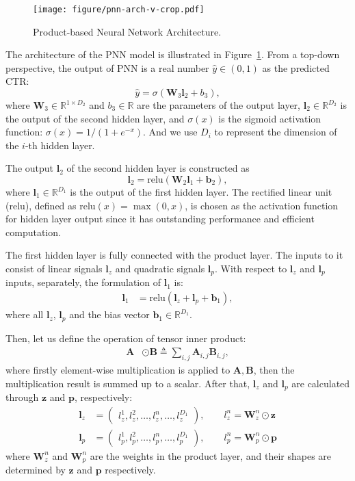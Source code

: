 \documentclass[conference]{IEEEtran}
\newcommand{\bs}{\boldsymbol}
\newcommand{\bW}{\bs{W}}
\newcommand{\bb}{\bs{b}}
\newcommand{\bl}{\bs{l}}
\newcommand{\bz}{\bs{z}}
\newcommand{\bp}{\bs{p}}
\newcommand{\mR}{\mathbb{R}}
\newcommand{\relu}{\text{relu}}
\begin{document}
\begin{figure}[t]
	\centering
	\texttt{[image: figure/pnn-arch-v-crop.pdf]}
	\caption{Product-based Neural Network Architecture.}\label{fig:pnn}
\end{figure}

The architecture of the PNN model is illustrated in Figure~\ref{fig:pnn}.
From a top-down perspective, the output of PNN is a real number $\hat{y} \in ( 0, 1 )$ as the predicted CTR:
\begin{equation}
\hat{y} = \sigma(\bW_3 \bl_2 + b_3), \label{eq:output}
\end{equation}
where $\bW_3 \in \mR^{1 \times D_2}$ and $b_3 \in \mR$ are the parameters of the output layer, $\bl_2 \in \mR^{D_2}$ is the output of the second hidden layer, and $\sigma(x)$ is the sigmoid activation function: $\sigma(x)= 1 / (1 + e^{-x})$. And we use $D_i$ to represent the dimension of the $i$-th hidden layer.

The output $\bl_2$ of the second hidden layer is constructed as
\begin{equation}
\bl_2 = \relu(\bW_2 \bl_1 + \bb_2),
\end{equation}
where $\bl_1 \in \mR^{D_1}$ is the output of the first hidden layer. The rectified linear unit (relu), defined as $\relu(x) = \max(0, x)$, is chosen as the activation function for hidden layer output since it has outstanding performance and efficient computation.


The first hidden layer is fully connected with the product layer. The inputs to it consist of linear signals $\bl_z$ and quadratic signals $\bl_p$. With respect to $\bl_z$ and $\bl_p$ inputs, separately, the formulation of $\bl_1$ is:
\begin{align}\label{eq:l1-formula}
\bl_1 &= \relu(\bl_z + \bl_p + \bb_1),
\end{align}
where all $\bl_z$, $\bl_p$ and the bias vector $\bb_1 \in \mR^{D_1}$.

Then, let us define the operation of tensor inner product:
\begin{align}
\bs{A} & \odot \bs{B} \triangleq \sum_{i,j} \bs{A}_{i,j} \bs{B}_{i,j},
\end{align}
where firstly element-wise multiplication is applied to $\bs{A}, \bs{B}$, then the multiplication result is summed up to a scalar. After that,
$\bl_z$ and $\bl_p$ are calculated through $\bz$ and $\bp$, respectively:
\begin{align}\label{eq:l1-lz-lp}
\bl_z &= \begin{pmatrix}
l_z^1, l_z^2, \ldots, l_z^n, \ldots , l_z^{D_1}
\end{pmatrix}, \qquad l_z^n = \bW_z^n \odot \bz\\
\bl_p &= \begin{pmatrix}
l_p^1, l_p^2, \ldots, l_p^n, \ldots , l_p^{D_1}
\end{pmatrix}, \qquad l_p^n = \bW_p^n \odot \bp  \nonumber
\end{align}
where $\bW_z^n$ and $\bW_p^n$ are the weights in the product layer, and their shapes are determined by $\bz$ and $\bp$ respectively.
\end{document}
